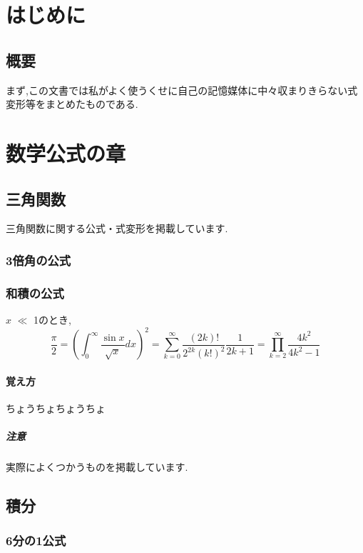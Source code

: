 \documentclass[]{jreport}
\begin{document}
\part{はじめに}
\chapter{概要}

まず,この文書では私がよく使うくせに自己の記憶媒体に中々収まりきらない式変形等をまとめたものである.

\part{数学公式の章}
\chapter{三角関数}

三角関数に関する公式・式変形を掲載しています.

\section{3倍角の公式}
\section{和積の公式}

$x$ $\ll$ 1のとき,
\begin{equation}
    \frac{\pi}{2} =
    \left( \int_{0}^{\infty} \frac{\sin x}{\sqrt{x}} dx \right)^2 =
    \sum_{k=0}^{\infty} \frac{(2k)!}{2^{2k}(k!)^2} \frac{1}{2k+1} =
    \prod_{k=2}^{\infty} \frac{4k^2}{4k^2 - 1}
\end{equation}

\subsection{覚え方}

ちょうちょちょうちょ

\subsubsection{注意}

実際によくつかうものを掲載しています.

\chapter{積分}

\section{6分の1公式}
\end{document}
